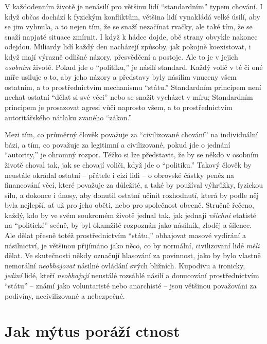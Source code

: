 \documentclass{book}
\begin{document}
V každodenním životě je nenásilí pro většinu lidí \enquote{standardním} typem chování. I když občas dochází k fyzickým konfliktům, většina lidí vynakládá velké úsilí, aby se jim vyhnula, a to nejen tím, že se snaží nezačínat rvačky, ale také tím, že se snaží napjaté situace zmírnit. I když k hádce dojde, obě strany obvykle nakonec odejdou. Miliardy lidí každý den nacházejí způsoby, jak pokojně koexistovat, i když mají výrazně odlišné názory, přesvědčení a postoje. Ale to je v jejich \emph{osobním} životě. Pokud jde o \enquote{politiku,} je násilí standard. Každý volič v té či oné míře usiluje o to, aby jeho názory a představy byly násilím vnuceny všem ostatním, a to prostřednictvím mechanismu \enquote{státu.} Standardním principem není nechat ostatní \enquote{dělat si své věci} nebo se snažit vycházet v míru; Standardním principem je prosazovat agresi vůči naprosto všem, a to prostřednictvím autoritářského nátlaku zvaného \enquote{zákon.}

Mezi tím, co průměrný člověk považuje za \enquote{civilizované chování} na individuální bázi, a tím, co považuje za legitimní a civilizované, pokud jde o jednání \enquote{autority,} je ohromný rozpor. Těžko si lze představit, že by se někdo v osobním životě choval tak, jak se chovají voliči, když jde o \enquote{politiku.} Takový člověk by neustále okrádal ostatní -- přátele i cizí lidi -- o obrovské částky peněz na financování věcí, které považuje za důležité, a také by používal výhrůžky, fyzickou sílu, a dokonce i únosy, aby donutil ostatní učinit rozhodnutí, která by podle něj byla nejlepší, ať už pro jeho oběti, nebo pro společnost obecně. Stručně řečeno, každý, kdo by ve svém soukromém životě jednal tak, jak jednají \emph{všichni} etatisté na \enquote{politické} scéně, by byl okamžitě rozpoznán jako násilník, zloděj a šílenec. Ale dělat přesně totéž prostřednictvím \enquote{státu,} obhajovat masové vydírání a násilnictví, je většinou přijímáno jako něco, co by normální, civilizovaní lidé \emph{měli} dělat. Ve skutečnosti někdy označují hlasování za povinnost, jako by bylo vlastně nemorální \emph{neobhajovat} násilné ovládání svých bližních. Kupodivu a ironicky, \emph{jediní} lidé, kteří \emph{neobhajují} neustálé rozsáhlé násilí a donucování prostřednictvím \enquote{státu} -- známí jako voluntaristé nebo anarchisté -- jsou většinou považováni za podivíny, necivilizované a nebezpečné.

\section{Jak mýtus poráží ctnost}
\end{document}
